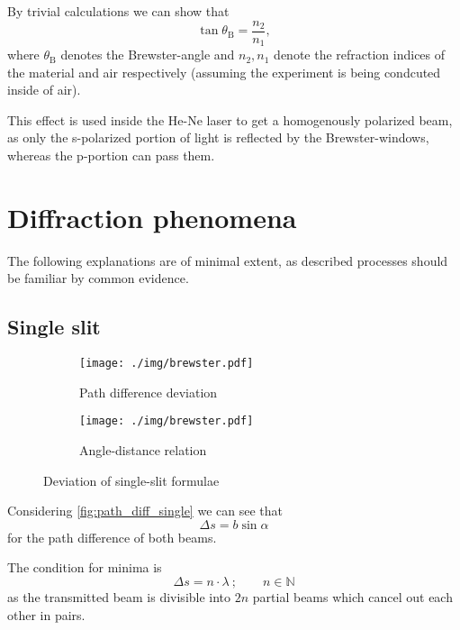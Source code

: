 By trivial calculations we can show that
\begin{equation}\label{eq:brewster}
	\tan\theta_\text{B}=\frac{n_2}{n_1},
\end{equation}
where $\theta_\text{B}$ denotes the Brewster-angle and $n_2, n_1$ denote the refraction indices of the material and air respectively (assuming the experiment is being condcuted inside of air).

This effect is used inside the He-Ne laser to get a homogenously polarized beam, as only the s-polarized portion of light is reflected by the Brewster-windows, whereas the p-portion can pass them.

\section{Diffraction phenomena}
The following explanations are of minimal extent, as described processes should be familiar by common evidence.

\subsection{Single slit}

\begin{figure}[tb]
	\begin{subfigure}{.51\textwidth}
		\centering
		\texttt{[image: ./img/brewster.pdf]}
		\caption[Single slit I]{Path difference deviation}
		\label{fig:path_diff_single}
	\end{subfigure}
	\begin{subfigure}{.51\textwidth}
		\centering
		\texttt{[image: ./img/brewster.pdf]}
		\caption[Single slit II]{Angle-distance relation}
		\label{fig:angle_distance_single}
	\end{subfigure}
	\caption[Deviation of single-slit formulae]{Deviation of single-slit formulae}
\end{figure}

Considering \autoref{fig:path_diff_single} we can see that
\begin{equation*}
	\Delta s=b\sin\alpha
\end{equation*}
for the path difference of both beams.

The condition for minima is
\begin{equation}\label{eq:path_diff_min}
	\Delta s = n\cdot\lambda\ ;\qquad n\in\mathbb{N}
\end{equation}
as the transmitted beam is divisible into $2n$ partial beams which cancel out each other in pairs.

